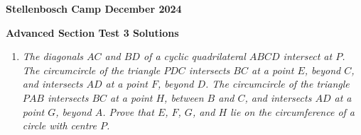 \documentclass[11pt]{article}
\begin{document}
\begin{center}
\textbf{Stellenbosch Camp December 2024}

\textbf{Advanced Section Test 3 Solutions}
\end{center}

\begin{enumerate}
\item \textit{The diagonals $AC$ and $BD$ of a cyclic quadrilateral $ABCD$ intersect at $P$. The circumcircle of the triangle $PDC$ intersects $BC$ at a point $E$, beyond $C$, and intersects $AD$ at a point $F$, beyond $D$. The circumcircle of the triangle $PAB$ intersects $BC$ at a point $H$, between $B$ and $C$, and intersects $AD$ at a point $G$, beyond $A$. Prove that $E$, $F$, $G$, and $H$ lie on the circumference of a circle with centre $P$.}


\end{enumerate}
\end{document}
